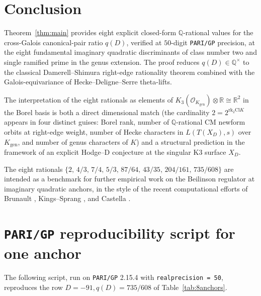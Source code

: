 \documentclass[11pt,a4paper]{amsart}
\theoremstyle{plain}
\theoremstyle{definition}
\newcommand{\Q}{\mathbb{Q}}
\newcommand{\R}{\mathbb{R}}
\newcommand{\Cl}{\mathrm{Cl}}
\newcommand{\rkk}{\mathrm{rk}}
\newcommand{\Kgen}{K_{\mathrm{gen}}}
\begin{document}
\section{Conclusion}\label{sec:conclusion}

Theorem~\ref{thm:main} provides eight explicit closed-form
$\Q$-rational values for the cross-Galois canonical-pair ratio $q(D)$,
verified at $50$-digit \texttt{PARI/GP} precision, at the eight
fundamental imaginary quadratic discriminants of class number two and
single ramified prime in the genus extension. The proof reduces
$q(D) \in \Q^\times$ to the classical Damerell--Shimura right-edge
rationality theorem combined with the Galois-equivariance of
Hecke--Deligne--Serre theta-lifts.

The interpretation of the eight rationals as elements of
$K_3(\mathcal{O}_\Kgen) \otimes \R \cong \R^2$ in the Borel basis is
both a direct dimensional match (the cardinality $2 = 2^{\rkk_2 \Cl K}$
appears in four distinct guises: Borel rank, number of $\Q$-rational
CM newform orbits at right-edge weight, number of Hecke characters in
$L(T(X_D), s)$ over $\Kgen$, and number of genus characters of $K$)
and a structural prediction in the framework of an explicit Hodge--D
conjecture at the singular K3 surface $X_D$.

The eight rationals
$\{2,\,4/3,\,7/4,\,5/3,\,87/64,\,43/35,\,204/161,\,735/608\}$
are intended as a benchmark for further empirical work on the
Beilinson regulator at imaginary quadratic anchors, in the style of
the recent computational efforts of
Brunault \cite{Brunault2007}, Kings--Sprang \cite{KingsSprang2025},
and Castella \cite{Castella2024}.

\appendix

\section{\texttt{PARI/GP} reproducibility script for one anchor}\label{app:pari}

The following script, run on \texttt{PARI/GP} 2.15.4 with
\texttt{realprecision~=~50}, reproduces the row
$D = -91, q(D) = 735/608$ of Table~\ref{tab:8anchors}.
\end{document}
